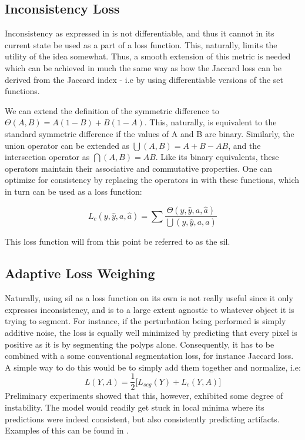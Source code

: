 \subsection{Inconsistency Loss}
Inconsistency as expressed in  is not differentiable, and thus it cannot in its current state be used as a part of a loss function. This, naturally, limits the utility of the idea somewhat. Thus, a smooth extension of this metric is needed which can be achieved in much the same way as how the Jaccard loss can be derived from the Jaccard index - i.e by using differentiable versions of the set functions. 

We can extend the definition of the symmetric difference to \(\Theta(A,B) = A(1-B) + B(1-A)\). This, naturally, is equivalent to the standard symmetric difference if the values of A and B are binary. Similarly, the union operator can be extended as \( \bigcup(A,B) = A+B-AB\), and the intersection operator as \( \bigcap(A,B) = AB\). Like its binary equivalents, these operators maintain their associative and commutative properties. One can optimize for consistency by replacing the operators in  with these functions, which in turn can be used as a loss function:

\begin{equation}
    L_c(y, \hat{y},  a, \hat{a}) = \sum \frac{\Theta(y, \hat{y},  a, \hat{a})}{\bigcup(y, \hat{y},  a, \hat{a})}
\end{equation}

This loss function will from this point be referred to as the \gls{sil}. 

\subsection{Adaptive Loss Weighing}
    Naturally, using \gls{sil} as a loss function on its own is not really useful since it only expresses inconsistency, and is to a large extent agnostic to whatever object it is trying to segment. For instance, if the perturbation being performed is simply additive noise, the loss is equally well minimized by predicting that every pixel is positive as it is by segmenting the polyps alone. Consequently, it has to be combined with a some conventional segmentation loss, for instance Jaccard loss. A simple way to do this would be to simply add them together and normalize, i.e:
\begin{equation*}
    L(Y, A) = \frac{1}{2} \big[L_{seg}(Y)+L_c(Y,A)\big]
\end{equation*}
Preliminary experiments showed that this, however, exhibited some degree of instability. The model would readily get stuck in local minima where its predictions were indeed consistent, but also consistently predicting artifacts. Examples of this can be found in . 

